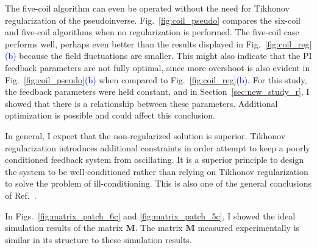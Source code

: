 
The five-coil algorithm can even be operated without the need for
Tikhonov regularization of the pseudoinverse.
Fig.~\ref{fig:coil_pseudo} compares the six-coil and five-coil
algorithms when no regularization is performed.  The five-coil case
performs well, perhaps even better than the results displayed in
Fig.~\ref{fig:coil_reg}\textcolor{blue}{(b)} because the field fluctuations are smaller.
This might also indicate that the PI feedback parameters are not fully
optimal, since more overshoot is also evident in
Fig.~\ref{fig:coil_pseudo}\textcolor{blue}{(b)} when compared to
Fig.~\ref{fig:coil_reg}\textcolor{blue}{(b)}.  For this study, the feedback parameters
were held constant, and in Section~\ref{sec:new_study_r}, I showed that there
is a relationship between these parameters.  Additional optimization
is possible and could affect this conclusion.

In general, I expect that the non-regularized solution is superior.
Tikhonov regularization introduces additional constraints in order
attempt to keep a poorly conditioned feedback system from oscillating.
It is a superior principle to design the system to be well-conditioned
rather than relying on Tikhonov regularization to solve the problem of
ill-conditioning.  This is also one of the general conclusions of
Ref.~\cite{rawlik}.

In Figs.~\ref{fig:matrix_patch_6c} and \ref{fig:matrix_patch_5c}, I
showed the ideal simulation results of the matrix $\bm{M}$.  The matrix $\bm{M}$ measured
experimentally is similar in its structure to these simulation
results.


